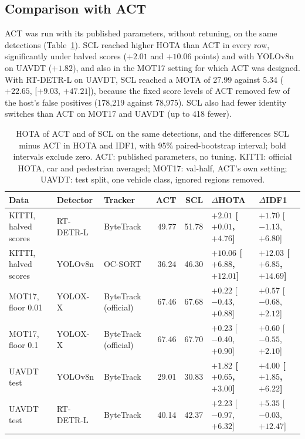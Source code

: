 \subsection{Comparison with ACT}\label{sec:res-act}
ACT \cite{act2026adaptive} was run with its published parameters, without retuning, on the same detections (Table~\ref{tab:res-act}). SCL reached higher HOTA than ACT in every row, significantly under halved scores ($+2.01$ and $+10.06$ points) and with YOLOv8n on UAVDT ($+1.82$), and also in the MOT17 setting for which ACT was designed. With RT-DETR-L on UAVDT, SCL reached a MOTA of 27.99 against 5.34 ($+22.65$, [$+9.03$, $+47.21$]), because the fixed score levels of ACT removed few of the host's false positives (178,219 against 78,975). SCL also had fewer identity switches than ACT on MOT17 and UAVDT (up to 418 fewer).

\begin{table}[tbp]
\centering
\caption{HOTA of ACT and of SCL on the same detections, and the differences SCL minus ACT in HOTA and IDF1, with 95\% paired-bootstrap interval; bold intervals exclude zero. ACT: published parameters, no tuning. KITTI: official HOTA, car and pedestrian averaged; MOT17: val-half, ACT's own setting; UAVDT: test split, one vehicle class, ignored regions removed.}
\label{tab:res-act}
\begin{tabular}{>{\raggedright\arraybackslash}p{2.3cm}>{\raggedright\arraybackslash}p{1.8cm}>{\raggedright\arraybackslash}p{2.1cm}rr>{\raggedright\arraybackslash}p{2.6cm}>{\raggedright\arraybackslash}p{2.6cm}}
\toprule
Data & Detector & Tracker & ACT & SCL & $\Delta$HOTA & $\Delta$IDF1\\
\midrule
KITTI, halved scores & RT-DETR-L & ByteTrack & 49.77 & 51.78 & \textbf{$+2.01$ [$+0.01$, $+4.76$]} & $+1.70$ [$-1.13$, $+6.80$]\\
KITTI, halved scores & YOLOv8n & OC-SORT & 36.24 & 46.30 & \textbf{$+10.06$ [$+6.88$, $+12.01$]} & \textbf{$+12.03$ [$+6.85$, $+14.69$]}\\
MOT17, floor 0.01 & YOLOX-X & ByteTrack (official) & 67.46 & 67.68 & $+0.22$ [$-0.43$, $+0.88$] & $+0.57$ [$-0.68$, $+2.12$]\\
MOT17, floor 0.1 & YOLOX-X & ByteTrack (official) & 67.46 & 67.70 & $+0.23$ [$-0.40$, $+0.90$] & $+0.60$ [$-0.55$, $+2.10$]\\
UAVDT test & YOLOv8n & ByteTrack & 29.01 & 30.83 & \textbf{$+1.82$ [$+0.65$, $+3.00$]} & \textbf{$+4.00$ [$+1.85$, $+6.22$]}\\
UAVDT test & RT-DETR-L & ByteTrack & 40.14 & 42.37 & $+2.23$ [$-0.97$, $+6.32$] & $+5.35$ [$-0.03$, $+12.47$]\\
\bottomrule
\end{tabular}
\end{table}

